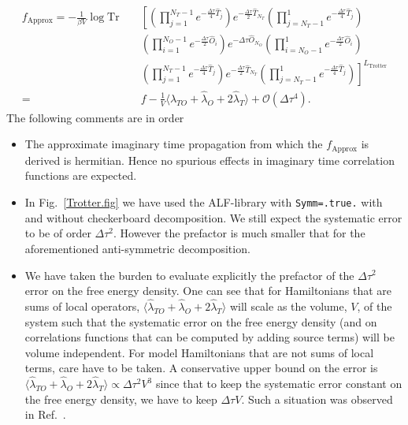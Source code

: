 \begin{eqnarray}
f_{\text{Approx} }  =    
   -\frac{1}{\beta V } \log \text{Tr } & & \left[   \left(\prod_{j=1}^{N_T-1} e^{-\frac{\Delta \tau}{4} \hat{T}_j } \right)    e^{-\frac{\Delta \tau}{2} \hat{T}_{N_T} }    
   \left(  \prod_{j=N_T-1}^{1} e^{-\frac{\Delta \tau}{4} \hat{T}_j } \right)     \right. \nonumber \\   
      & & \left(\prod_{i=1}^{N_O-1} e^{-\frac{\Delta \tau}{2} \hat{O}_i } \right)    e^{-\Delta \tau \hat{O}_{N_O} }    
     \left( \prod_{i=N_O-1}^{1} e^{-\frac{\Delta \tau}{2} \hat{O}_i } \right)   \nonumber  \\
     & & \left.   \left(\prod_{j=1}^{N_T-1} e^{-\frac{\Delta \tau}{4} \hat{T}_j } \right)    e^{-\frac{\Delta \tau}{2} \hat{T}_{N_T} }    
   \left(  \prod_{j=N_T-1}^{1} e^{-\frac{\Delta \tau}{4} \hat{T}_j } \right)   
   \right]^{L_{\text{Trotter}}}     \nonumber  \\ 
   = & &  f    - \frac{1}{V}   \langle \hat{\lambda}_{TO} + \hat{\lambda}_{O} + 2 \hat{\lambda}_{T} \rangle  + \mathcal{O}( \Delta \tau ^4). 
\end{eqnarray}
The following comments are in order
\begin{itemize}
\item   The  approximate  imaginary time propagation   from which the $f_{\text{Approx} } $ is derived is   hermitian.  Hence  no spurious effects in 
imaginary  time correlation functions are   expected. 
\item  In Fig.~\ref{Trotter.fig} we  have used the ALF-library with   \texttt{Symm=.true.}  with and without checkerboard decomposition.  We still expect the systematic error to be of order $\Delta \tau ^2 $.  However the prefactor is much smaller  that for the aforementioned  anti-symmetric decomposition.    
\item   We have taken the burden to evaluate explicitly the prefactor of the $\Delta \tau ^2$ error on the free energy density.    One can  see that for Hamiltonians  that are sums of local  operators,   $ \langle \hat{\lambda}_{TO} + \hat{\lambda}_{O} + 2 \hat{\lambda}_{T} \rangle  $   will scale as the volume, $V$,  of the system such that  the systematic  error on the free energy density  (and on correlations  functions that can be computed  by adding source terms)  will be  volume  independent.   For model  Hamiltonians that are not sums of local terms, care have to be taken.     A conservative upper bound on the  error is $ \langle \hat{\lambda}_{TO} + \hat{\lambda}_{O} + 2 \hat{\lambda}_{T} \rangle    \propto \Delta \tau^2 V^3 $ since that  to keep the  systematic error constant on the free energy density, we have to keep   $ \Delta \tau V $.   Such a situation was observed in Ref.~\cite{WangZ20}.
\end{itemize}




